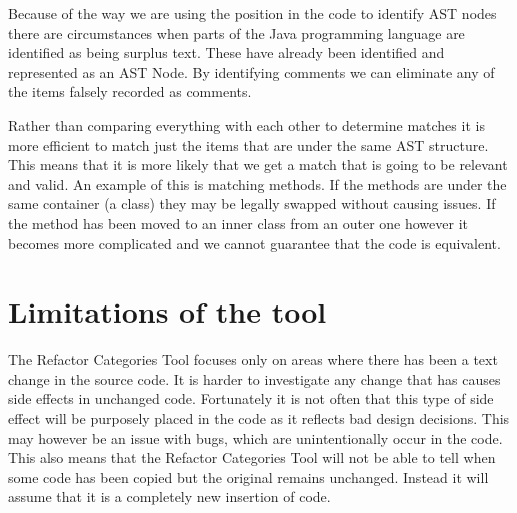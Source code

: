 Because of the way we are using the position in the code to identify AST nodes there are circumstances when parts of the Java programming language are identified as being surplus text. These have already been identified and represented as an AST Node. By identifying comments we can eliminate any of the items falsely recorded as comments.


% 
% 

Rather than comparing everything with each other to determine matches it is more efficient to match just the items that are under the same AST structure.  This means that it is more likely that we get a match that is going to be relevant and valid.  An example of this is matching methods. If the methods are under the same container (a class) they may be legally swapped without causing issues.  If the method has been moved to an inner class from an outer one however it becomes more complicated and we cannot guarantee that the code is equivalent.  


\section{Limitations of the tool}
The Refactor Categories Tool focuses only on areas where there has been a text change in the source code. 
It is harder to investigate any change that has causes side effects in unchanged code.  Fortunately it is not often that this type of side effect will be purposely placed in the code as it reflects bad design decisions.  This may however be an issue with bugs, which are unintentionally occur in the code.
This also means that the Refactor Categories Tool will not be able to tell when some code has been copied but the original remains unchanged. Instead it will assume that it is a completely new insertion of code.

